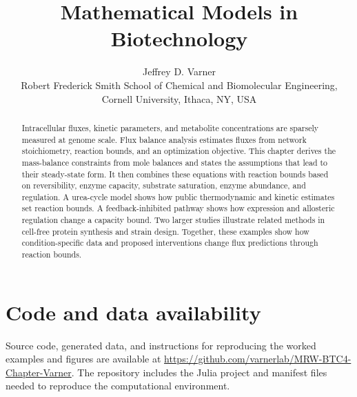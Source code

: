 \documentclass[11pt]{article}
\title{Mathematical Models in Biotechnology}
\author{Jeffrey D. Varner\\
  Robert Frederick Smith School of Chemical and Biomolecular Engineering,\\
  Cornell University, Ithaca, NY, USA}
\date{}
\begin{document}
\maketitle
\begin{abstract}
Intracellular fluxes, kinetic parameters, and metabolite concentrations are
sparsely measured at genome scale. Flux balance analysis estimates fluxes
from network stoichiometry, reaction bounds, and an optimization objective.
This chapter derives the mass-balance constraints from mole balances and
states the assumptions that lead to their steady-state form. It then combines
these equations with reaction bounds based on reversibility, enzyme capacity, substrate saturation,
enzyme abundance, and regulation. A urea-cycle model shows how public
thermodynamic and kinetic estimates set reaction bounds. A
feedback-inhibited pathway shows how expression and allosteric regulation
change a capacity bound. Two larger studies illustrate related methods in
cell-free protein synthesis and strain design. Together, these examples show
how condition-specific data and proposed interventions change flux
predictions through reaction bounds.
\end{abstract}








\section*{Code and data availability}
Source code, generated data, and instructions for reproducing the worked
examples and figures are available at
\url{https://github.com/varnerlab/MRW-BTC4-Chapter-Varner}. The repository
includes the Julia project and manifest files needed to reproduce the
computational environment.


\end{document}

